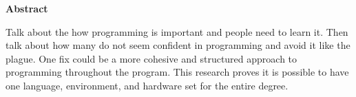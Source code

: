 \begin{flushleft}
    \Large
    \textbf{Abstract}
    \vspace{5pt}
    
    \normalsize
    \thispagestyle{empty}
    Talk about the how programming is important and people need to 
    learn it. Then talk about how many do not seem confident in 
    programming and avoid it like the plague. One fix could be a 
    more cohesive and structured approach to programming throughout 
    the program. This research proves it is possible to have one 
    language, environment, and hardware set for the entire degree.
\end{flushleft}

